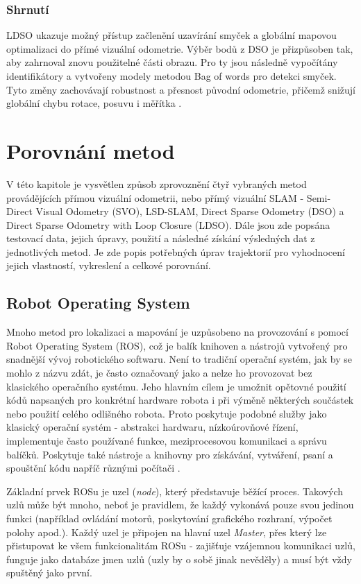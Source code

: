 \documentclass[12pt,a4paper]{report}
\begin{document}
\subsection*{Shrnutí}
LDSO ukazuje možný přístup začlenění uzavírání smyček a globální mapovou optimalizaci do přímé vizuální odometrie. Výběr bodů z DSO je přizpůsoben tak, aby zahrnoval znovu použitelné části obrazu. Pro ty jsou následně vypočítány identifikátory a vytvořeny modely metodou Bag of words pro detekci smyček. Tyto změny zachovávají robustnost a přesnost původní odometrie, přičemž snižují globální chybu rotace, posuvu i měřítka \cite{LDSO}.


\chapter{Porovnání metod}
V této kapitole je vysvětlen způsob zprovoznění čtyř vybraných metod provádějících přímou vizuální odometrii, nebo přímý vizuální SLAM - Semi-Direct Visual Odometry (SVO), LSD-SLAM, Direct Sparse Odometry (DSO) a Direct Sparse Odometry with Loop Closure (LDSO). Dále jsou zde popsána testovací data, jejich úpravy, použití a následné získání výsledných dat z jednotlivých metod. Je zde popis potřebných úprav trajektorií pro vyhodnocení jejich vlastností, vykreslení a celkové porovnání.

\section{Robot Operating System}
Mnoho metod pro lokalizaci a mapování je uzpůsobeno na provozování s pomocí Robot Operating System (ROS), což je balík knihoven a nástrojů vytvořený pro snadnější vývoj robotického softwaru. Není to tradiční operační systém, jak by se mohlo z názvu zdát, je často označovaný jako  a nelze ho provozovat bez klasického operačního systému. Jeho hlavním cílem je umožnit opětovné použití kódů napsaných pro konkrétní hardware robota i při výměně některých součástek nebo použití celého odlišného robota. Proto poskytuje podobné služby jako klasický operační systém - abstrakci hardwaru, nízkoúrovňové řízení, implementuje často používané funkce, meziprocesovou komunikaci a správu balíčků. Poskytuje také nástroje a knihovny pro získávání, vytváření, psaní a spouštění kódu napříč různými počítači \cite{ROS}.

Základní prvek ROSu je uzel (\textit{node}), který představuje běžící proces. Takových uzlů může být mnoho, neboť je pravidlem, že každý vykonává pouze svou jedinou funkci (například ovládání motorů, poskytování grafického rozhraní, výpočet polohy apod.). Každý uzel je připojen na hlavní uzel \textit{Master}, přes který lze přistupovat ke všem funkcionalitám ROSu - zajišťuje vzájemnou komunikaci uzlů, funguje jako databáze jmen uzlů (uzly by o sobě jinak nevěděly) a musí být vždy spuštěný jako první. 
\end{document}
